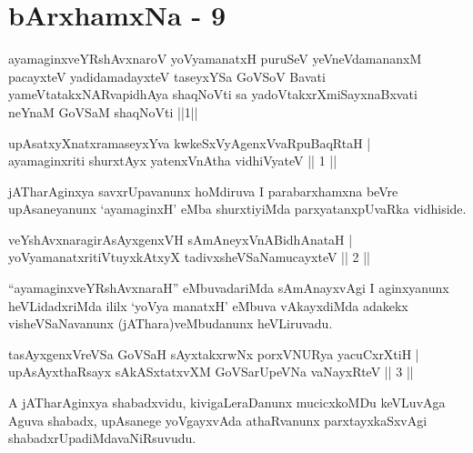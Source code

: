 \chapter{bArxhamxNa - 9}

\begin{kandikeshl}
ayamaginxveYRshAvxnaroV yoV\s yamanatxH puruSeV yeVneVdamananxM pacayxteV yadidamadayxteV taseyxYSa GoVSoV Bavati yameVtatakxNARvapidhAya shaqNoVti sa yadoVtakxrXmiSayxnaBxvati neYnaM GoVSaM shaqNoVti ||1||
\end{kandikeshl}


\begin{shl}
upAsatxyXnatxramaseyxYva kwkeSxVyAgenxVvaRpuBaqRtaH | \\
ayamaginxriti shurxtAyx yatenxVnAtha vidhiVyateV \hfill ||  1 || 
\end{shl}

\begin{artha}
jATharAginxya savxrUpavanunx hoMdiruva I parabarxhamxna beVre upAsaneyanunx `ayamaginxH' eMba shurxtiyiMda parxyatanxpUvaRka vidhiside.
\end{artha}


\begin{shl}
veYshAvxnaragirA\s sAyxgenxVH sAmAneyxVnABidhAnataH | \\
yoV\s yamanatxritiVtuyxkAtxyX tadivxsheVSaNamucayxteV \hfill ||  2 || 
\end{shl}

\begin{artha}
``ayamaginxveYRshAvxnaraH'' eMbuvadariMda sAmAnayxvAgi I aginxyanunx heVLidadxriMda ililx `yoV\s ya manatxH' eMbuva vAkayxdiMda adakekx visheVSaNavanunx (jAThara)veMbudanunx heVLiruvadu.
\end{artha}


\begin{shl}
tasAyxgenxVreVSa GoVSaH sAyxtakxrwNx porxVNURya yacuCxrXtiH | \\
upAsAyxthaRsayx sAkASxtatxvXM GoVSarUpeVNa vaNayxRteV \hfill ||  3 || 
\end{shl}

\begin{artha}
A jATharAginxya shabadxvidu, kivigaLeraDanunx mucicxkoMDu keVLuvAga Aguva shabadx, upAsanege yoVgayxvAda athaRvanunx parxtayxkaSxvAgi shabadxrUpadiMda\break vaNiRsuvudu.
\end{artha}

